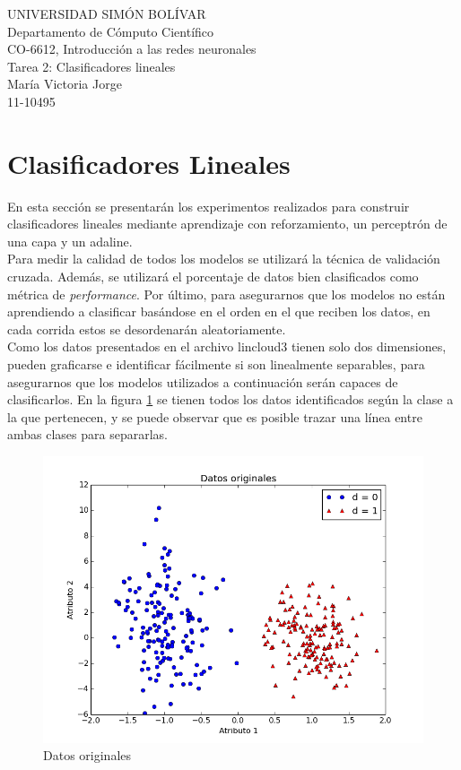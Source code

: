 \documentclass[a4paper]{article}
\begin{document}
\noindent UNIVERSIDAD SIMÓN BOLÍVAR\\
Departamento de Cómputo Científico\\
CO-6612, Introducción a las redes neuronales\\
Tarea 2: Clasificadores lineales\\
María Victoria Jorge\\
11-10495

\section{Clasificadores Lineales}
	En esta sección se presentarán los experimentos realizados para construir clasificadores lineales mediante aprendizaje con reforzamiento, un perceptrón de una capa y un adaline.\\
	
	Para medir la calidad de todos los modelos se utilizará la técnica de validación cruzada. Además, se utilizará el porcentaje de datos bien clasificados como métrica de \textit{performance}. Por último, para asegurarnos que los modelos no están aprendiendo a clasificar basándose en el orden en el que reciben los datos, en cada corrida estos se desordenarán aleatoriamente.\\
	
	Como los datos presentados en el archivo lincloud3 tienen solo dos dimensiones, pueden graficarse e identificar fácilmente si
	son linealmente separables, para asegurarnos que los modelos utilizados a continuación serán capaces de clasificarlos. En la figura \ref{fig:datosOriginales} se tienen todos los datos identificados según la clase a la que pertenecen, y se puede observar que es posible trazar una línea entre ambas clases para separarlas.
	
	\begin{figure}[H]
	  \centering
	  \includegraphics[scale=0.4]{datos.png}
	  \caption{Datos originales}
	  \label{fig:datosOriginales}
	\end{figure}
	
\end{document}

